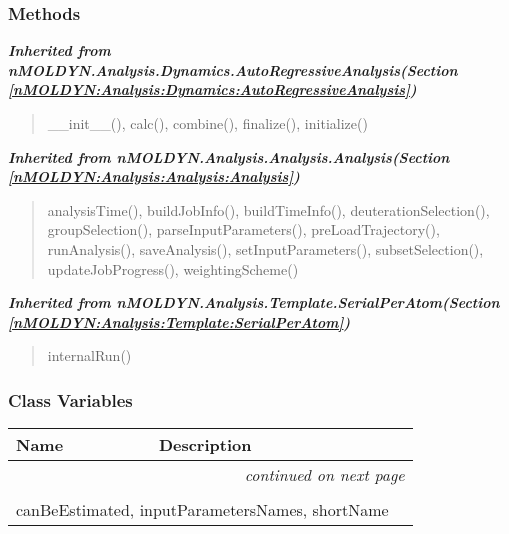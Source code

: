 
  \subsubsection{Methods}


\large{\textbf{\textit{Inherited from nMOLDYN.Analysis.Dynamics.AutoRegressiveAnalysis\textit{(Section \ref{nMOLDYN:Analysis:Dynamics:AutoRegressiveAnalysis})}}}}

\begin{quote}
\_\_init\_\_(), calc(), combine(), finalize(), initialize()
\end{quote}

\large{\textbf{\textit{Inherited from nMOLDYN.Analysis.Analysis.Analysis\textit{(Section \ref{nMOLDYN:Analysis:Analysis:Analysis})}}}}

\begin{quote}
analysisTime(), buildJobInfo(), buildTimeInfo(), deuterationSelection(), groupSelection(), parseInputParameters(), preLoadTrajectory(), runAnalysis(), saveAnalysis(), setInputParameters(), subsetSelection(), updateJobProgress(), weightingScheme()
\end{quote}

\large{\textbf{\textit{Inherited from nMOLDYN.Analysis.Template.SerialPerAtom\textit{(Section \ref{nMOLDYN:Analysis:Template:SerialPerAtom})}}}}

\begin{quote}
internalRun()
\end{quote}


  \subsubsection{Class Variables}

    \vspace{-1cm}
\hspace{\varindent}\begin{longtable}{|p{\varnamewidth}|p{\vardescrwidth}|l}
\cline{1-2}
\cline{1-2} \centering \textbf{Name} & \centering \textbf{Description}& \\
\cline{1-2}
\endhead\cline{1-2}\multicolumn{3}{r}{\small\textit{continued on next page}}\\\endfoot\cline{1-2}
\endlastfoot\multicolumn{2}{|l|}{\textit{Inherited from nMOLDYN.Analysis.Dynamics.AutoRegressiveAnalysis \textit{(Section \ref{nMOLDYN:Analysis:Dynamics:AutoRegressiveAnalysis})}}}\\
\multicolumn{2}{|p{\varwidth}|}{\raggedright canBeEstimated, inputParametersNames, shortName}\\
\cline{1-2}
\end{longtable}

